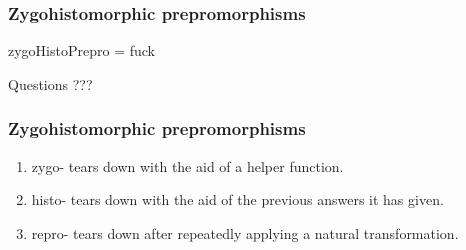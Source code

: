 \documentclass{beamer}
\begin{document}
\begin{frame}
  \frametitle{Zygohistomorphic prepromorphisms}
  
  zygoHistoPrepro = fuck
  
\end{frame}

\begin{frame}{Questions}
  ???  
\end{frame}


\begin{frame}
  \frametitle{Zygohistomorphic prepromorphisms}

\begin{enumerate}
\item zygo- tears down with the aid of a helper function.

\item histo- tears down with the aid of the previous answers it has given.

\item repro- tears down after repeatedly applying a natural transformation.
\end{enumerate}



\end{frame}
\end{document}
